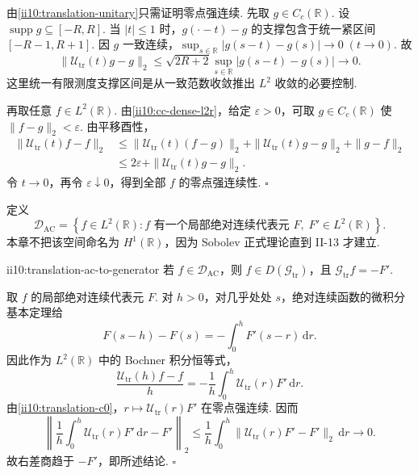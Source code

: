 \begin{FAProof}
由\autoref{ii10:translation-unitary}只需证明零点强连续. 先取 \(\displaystyle g\in C_c(\mathbb R)\). 设 \(\displaystyle\operatorname{supp}g\subseteq[-R,R]\). 当 \(\displaystyle|t|\leqslant1\) 时，\(\displaystyle g(\cdot-t)-g\) 的支撑包含于统一紧区间 \(\displaystyle[-R-1,R+1]\). 因 \(\displaystyle g\) 一致连续，\(\displaystyle \sup_{s\in\mathbb R}|g(s-t)-g(s)|\longrightarrow0 \;(t\to0)\). 故
\[
\|\mathcal U_{\mathrm{tr}}(t)g-g\|_2
\leqslant
\sqrt{2R+2}
\sup_{s\in\mathbb R}|g(s-t)-g(s)|
\longrightarrow0.
\]
这里统一有限测度支撑区间是从一致范数收敛推出 \(\displaystyle L^2\) 收敛的必要控制.

再取任意 \(\displaystyle f\in L^2(\mathbb R)\). 由\autoref{ii10:cc-dense-l2r}，给定 \(\displaystyle\varepsilon>0\)，可取 \(\displaystyle g\in C_c(\mathbb R)\) 使 \(\displaystyle\|f-g\|_2<\varepsilon\). 由平移酉性，
\[
\begin{aligned}
\|\mathcal U_{\mathrm{tr}}(t)f-f\|_2
&\leqslant
\|\mathcal U_{\mathrm{tr}}(t)(f-g)\|_2
+\|\mathcal U_{\mathrm{tr}}(t)g-g\|_2
+\|g-f\|_2\\
&\leqslant
2\varepsilon+\|\mathcal U_{\mathrm{tr}}(t)g-g\|_2.
\end{aligned}
\]
令 \(\displaystyle t\to0\)，再令 \(\displaystyle\varepsilon\downarrow0\)，得到全部 \(\displaystyle f\) 的零点强连续性.
\hfill\(\square\)
\end{FAProof}

定义
\[
\mathcal D_{\mathrm{AC}}
=
\left\{
 f\in L^2(\mathbb R):
 f\text{ 有一个局部绝对连续代表元 }F,
\;F'\in L^2(\mathbb R)
\right\}.
\]
本章不把该空间命名为 \(\displaystyle H^1(\mathbb R)\)，因为 Sobolev 正式理论直到 II-13 才建立.

\begin{FAProposition}[B][局部绝对连续域包含于平移生成元域]{ii10:translation-ac-to-generator}
若 \(\displaystyle f\in\mathcal D_{\mathrm{AC}}\)，则 \(\displaystyle f\in D(\mathcal G_{\mathrm{tr}})\)，且 \(\displaystyle \mathcal G_{\mathrm{tr}}f=-F'.\)
\end{FAProposition}

\begin{FAProof}
取 \(\displaystyle f\) 的局部绝对连续代表元 \(\displaystyle F\). 对 \(\displaystyle h>0\)，对几乎处处 \(\displaystyle s\)，绝对连续函数的微积分基本定理给
\[
F(s-h)-F(s)
=
-\int_0^hF'(s-r)\,\mathrm{d}r.
\]
因此作为 \(\displaystyle L^2(\mathbb R)\) 中的 Bochner 积分恒等式，
\[
\frac{\mathcal U_{\mathrm{tr}}(h)f-f}{h}
=
-\frac1h\int_0^h\mathcal U_{\mathrm{tr}}(r)F'\,\mathrm{d}r.
\]
由\autoref{ii10:translation-c0}，\(\displaystyle r\mapsto\mathcal U_{\mathrm{tr}}(r)F'\) 在零点强连续. 因而
\[
\left\|
\frac1h\int_0^h\mathcal U_{\mathrm{tr}}(r)F'\,\mathrm{d}r-F'
\right\|_2
\leqslant
\frac1h\int_0^h
\|\mathcal U_{\mathrm{tr}}(r)F'-F'\|_2
\,\mathrm{d}r
\longrightarrow0.
\]
故右差商趋于 \(\displaystyle-F'\)，即所述结论.
\hfill\(\square\)
\end{FAProof}

